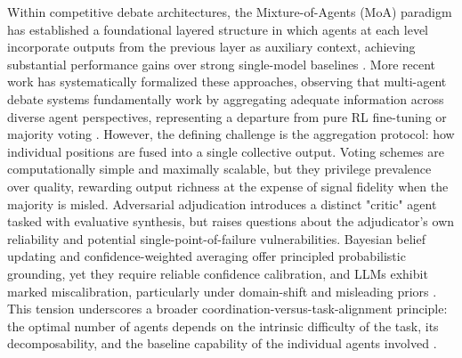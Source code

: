 \documentclass[11pt,a4paper]{article}
\begin{document}
Within competitive debate architectures, the Mixture-of-Agents (MoA) paradigm has established a foundational layered structure in which agents at each level incorporate outputs from the previous layer as auxiliary context, achieving substantial performance gains over strong single-model baselines \cite{arxiv:2406.04692v1}. More recent work has systematically formalized these approaches, observing that multi-agent debate systems fundamentally work by aggregating adequate information across diverse agent perspectives, representing a departure from pure RL fine-tuning or majority voting \cite{arxiv:2503.01935v1}. However, the defining challenge is the aggregation protocol: how individual positions are fused into a single collective output. Voting schemes are computationally simple and maximally scalable, but they privilege prevalence over quality, rewarding output richness at the expense of signal fidelity when the majority is misled. Adversarial adjudication introduces a distinct "critic" agent tasked with evaluative synthesis, but raises questions about the adjudicator's own reliability and potential single-point-of-failure vulnerabilities. Bayesian belief updating and confidence-weighted averaging offer principled probabilistic grounding, yet they require reliable confidence calibration, and LLMs exhibit marked miscalibration, particularly under domain-shift and misleading priors \cite{arxiv:2604.02460v2}. This tension underscores a broader coordination-versus-task-alignment principle: the optimal number of agents depends on the intrinsic difficulty of the task, its decomposability, and the baseline capability of the individual agents involved \cite{arxiv:2602.03794v1}.
\end{document}

